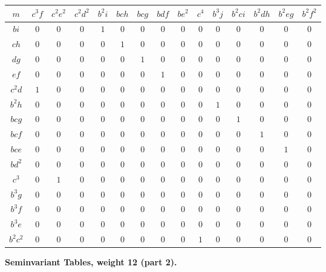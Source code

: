 \documentclass[11pt,a4paper]{book}
\begin{document}
{{{\begin{longtable}{|c|c|c|c|c|c|c|c|c|c|c|c|c|c|c|}
\hline
$m$ & $c^3f$ & $c^2e^2$ & $c^2d^2$ & $b^2i$ & $bch$ & $bcg$ & $bdf$ & $be^2$ & $c^4$ & $b^3j$ & $b^2ci$ & $b^2dh$ & $b^2eg$ & $b^2f^2$\\
\hline
\endhead
$bi$ & $0$ & $0$ & $0$ & $1$ & $0$ & $0$ & $0$ & $0$ & $0$ & $0$ & $0$ & $0$ & $0$ & $0$\\
$ch$ & $0$ & $0$ & $0$ & $0$ & $1$ & $0$ & $0$ & $0$ & $0$ & $0$ & $0$ & $0$ & $0$ & $0$\\
$dg$ & $0$ & $0$ & $0$ & $0$ & $0$ & $1$ & $0$ & $0$ & $0$ & $0$ & $0$ & $0$ & $0$ & $0$\\
$ef$ & $0$ & $0$ & $0$ & $0$ & $0$ & $0$ & $1$ & $0$ & $0$ & $0$ & $0$ & $0$ & $0$ & $0$\\
$c^2d$ & $1$ & $0$ & $0$ & $0$ & $0$ & $0$ & $0$ & $0$ & $0$ & $0$ & $0$ & $0$ & $0$ & $0$\\
$b^2h$ & $0$ & $0$ & $0$ & $0$ & $0$ & $0$ & $0$ & $0$ & $0$ & $1$ & $0$ & $0$ & $0$ & $0$\\
$bcg$ & $0$ & $0$ & $0$ & $0$ & $0$ & $0$ & $0$ & $0$ & $0$ & $0$ & $1$ & $0$ & $0$ & $0$\\
$bcf$ & $0$ & $0$ & $0$ & $0$ & $0$ & $0$ & $0$ & $0$ & $0$ & $0$ & $0$ & $1$ & $0$ & $0$\\
$bce$ & $0$ & $0$ & $0$ & $0$ & $0$ & $0$ & $0$ & $0$ & $0$ & $0$ & $0$ & $0$ & $1$ & $0$\\
$bd^2$ & $0$ & $0$ & $0$ & $0$ & $0$ & $0$ & $0$ & $0$ & $0$ & $0$ & $0$ & $0$ & $0$ & $0$\\
$c^3$ & $0$ & $1$ & $0$ & $0$ & $0$ & $0$ & $0$ & $0$ & $0$ & $0$ & $0$ & $0$ & $0$ & $0$\\
$b^3g$ & $0$ & $0$ & $0$ & $0$ & $0$ & $0$ & $0$ & $0$ & $0$ & $0$ & $0$ & $0$ & $0$ & $0$\\
$b^3f$ & $0$ & $0$ & $0$ & $0$ & $0$ & $0$ & $0$ & $0$ & $0$ & $0$ & $0$ & $0$ & $0$ & $0$\\
$b^3e$ & $0$ & $0$ & $0$ & $0$ & $0$ & $0$ & $0$ & $0$ & $0$ & $0$ & $0$ & $0$ & $0$ & $0$\\
$b^2c^2$ & $0$ & $0$ & $0$ & $0$ & $0$ & $0$ & $0$ & $0$ & $1$ & $0$ & $0$ & $0$ & $0$ & $0$\\
\hline
\end{longtable}

\newpage
\textbf{Seminvariant Tables, weight 12 (part 2).}

}}}
\end{document}
